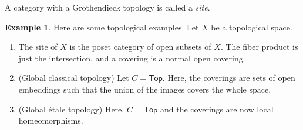 \documentclass[leqno, openany]{memoir}
\theoremstyle{definition}
\newtheorem{exm}[thm]{Example}
\theoremstyle{remark}
\theoremstyle{plain}
\theoremstyle{definition}
\theoremstyle{remark}
\newcommand{\ms}[1]{\mathsf{#1}}
\begin{document}
A category with a Grothendieck topology is called a \textit{site}.

\begin{exm} Here are some topological examples. Let $X$ be a topological space.
    \begin{enumerate} \item The site of $X$ is the poset category of open
        subsets of $X$. The fiber product is just the intersection, and a
        covering is a normal open covering.  \item (Global classical topology)
        Let $C = \ms{Top}$. Here, the coverings are sets of open embeddings
        such that the union of the images covers the whole space.  \item
        (Global \'etale topology) Here, $C = \ms{Top}$ and the coverings are
        now local homeomorphisms.  \end{enumerate} \end{exm}
\end{document}
